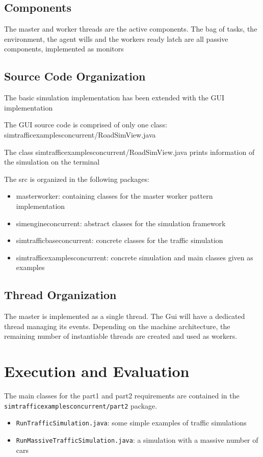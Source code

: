 \documentclass[12pt, a4paper]{report}
\begin{document}
\section{Components}
The master and worker threads are the active components. The bag of tasks, the environment, the agent wills and the workers ready
 latch are all passive components, implemented as monitors

\section{Source Code Organization}
The basic simulation implementation has been extended with the GUI implementation

The GUI source code is comprised of only one class: simtrafficexamplesconcurrent/RoadSimView.java

The class simtrafficexamplesconcurrent/RoadSimView.java prints information of the simulation on the terminal

The src is organized in the following packages:
\begin{itemize}
    \item masterworker: containing classes for the master worker pattern implementation
    \item simengineconcurrent: abstract classes for the simulation framework
    \item simtrafficbaseconcurrent: concrete classes for the traffic simulation
    \item simtrafficexamplesconcurrent: concrete simulation and main classes given as examples
\end{itemize}

\section{Thread Organization} %
The master is implemented as a single thread. The Gui will have a dedicated thread
 managing its events. Depending on the machine architecture, the remaining number
 of instantiable threads are created and used as workers.

\chapter{Execution and Evaluation}
The main classes for the part1 and part2 requirements are contained in the \texttt{simtrafficexamplesconcurrent/part2} package.
\begin{itemize}
    \item \texttt{RunTrafficSimulation.java}: some simple examples of traffic simulations
    \item \texttt{RunMassiveTrafficSimulation.java}: a simulation with a massive number of cars
\end{itemize}
\end{document}

